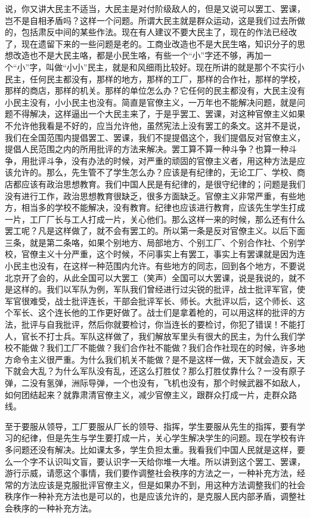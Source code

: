 说，你又讲大民主不适当，大民主是对付阶级敌人的，但是又说可以罢工、罢课，岂不是自相矛盾吗？这样一个问题。所谓大民主就是群众运动，这是我们过去所做的，包括肃反中间的某些作法。现在有人建议不要大民主了，现在的作法已经改了，现在遗留下来的一些问题是老的。工商业改造也不是大民生咯，知识分子的思想改造也不是大民主咯，都是小民生咯，有些一个“小”字还不够，再加一个“小”字，叫做“小小”民主，就是和风细雨比较好。现在所讲的就是那个不实行小民主，任何民主都没有，那样的地方，那样的工厂，那样的合作社，那样的学校，那样的商店，那样的机关。那样的单位怎么办？它任何的民主都没有，大民主没有小民主没有，小小民主也没有。简直是官僚主义，一万年也不能解决问题，就是问题不得解决，这样逼出一个大民主来了，于是乎罢工、罢课，对这种官僚主义如果不允许他我看是不好的，应当允许他，虽然宪法上没有罢工的条文。这并不是说，我们在全国范围内提倡罢工、罢课，我们不提提倡这个，我们提倡反对官僚主义，提倡人民范围之内的所用批评的方法来解决。罢工算不算一种斗争？也算一种斗争，用批评斗争，没有办法的时候，对严重的顽固的官僚主义者，用这种方法是应该允许的。那么，先生管不了学生怎么办？应该是有纪律的，无论工厂、学校、商店都应该有政治思想教育。我们中国人民是有纪律的，是很守纪律的；问题是我们没有进行工作，政治思想教育很缺乏，很多方面缺乏。官僚主义非常严重，有些地方，相当多的学校不能解决，没有教育。纪律也应该进行教育，应该先生学生打成一片，工厂厂长与工人打成一片，关心他们。那么这样一来的时候，那么还有什么罢工呢？凡是这样做了，就不会有罢工的。所以第一条是反对官僚主义。以后下面三条，就是第二条咯，如果个别地方、局部地方、个别工厂、个别合作社、个别学校，官僚主义十分严重，这个时候，不问事实上有罢工，事实上有罢课就是因为连小民主也没有，在这样一种范围内允许。有些地方的同志，回到各个地方，不要说北京开了会的，从此全国可以大罢工（笑声）全国可以大罢课，说是我说的，就不是这样的。我们以军队为例，军队我们曾经进行过尖锐的批评，战士批评军官，使军官很难受，战士批评连长，干部会批评军长、师长。大批评以后，这个师长、这个军长、这个连长他的工作更好做了。战士们是拿着枪的，可以用这样的批评的方法，批评与自我批评，然后你就要检讨，你当连长的要检讨，你犯了错误！不能打人，官长不打士兵。军队这样做了，我们解放军里头有很大的民主，为什么我们学校不能做？我们工厂不能做？我们合作社不能做？我们合作社现在的时候，许多地方命令主义很严重。为什么我们机关不能做？是不是这样一做，天下就会造反，天下就会大乱？为什么军队没有乱，还这么打胜仗？那么打胜仗靠什么？一没有原子弹，二没有氢弹，洲际导弹，一个也没有，飞机也没有，那个时候武器不如敌人，如何团结起来？就靠肃清官僚主义，减少官僚主义，跟群众打成一片，走群众路线。

至于要服从领导，工厂要服从厂长的领导、指挥，学生要服从先生的指挥，要有学习的纪律，但是先生与学生要打成一片，关心学生解决学生的问题。现在学校有许多问题还没有解决。比如课太多，学生负担太重。我看我们中国人民就是这样，要么一个字不认识叫文盲，要认识字一天给你堆一大堆。所以讲到这个罢工、罢课，游行示威，请愿这个事情，我们要作调整社会秩序的方法之一，一种补充方法，经常的方法应该是克服批评官僚主义，但是如果办不到，用这种方法调整我们的社会秩序作一种补充方法也是可以的，也是应该允许的，是克服人民内部矛盾，调整社会秩序的一种补充方法。

